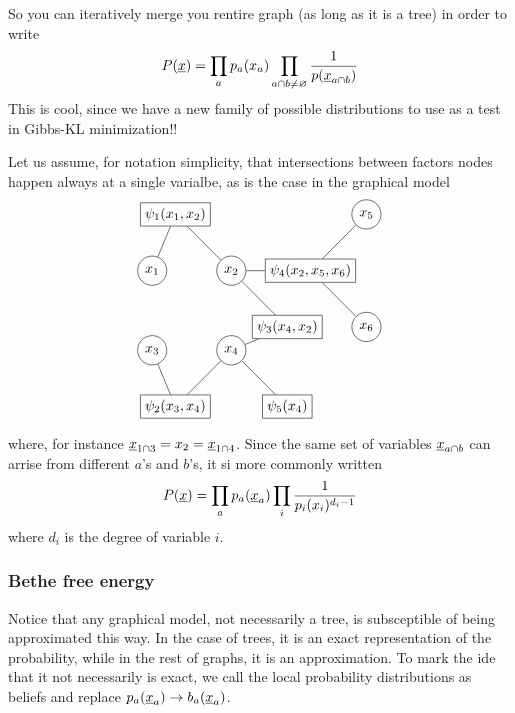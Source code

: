 So you can iteratively merge you rentire graph (as long as it is a tree) in order to write
\begin{equation}
 P(\underline{x}) = \prod_{a} p_a(x_a) \prod_{a \cap b\neq \varnothing} \frac 1 {p(\underline{x}_{a\cap b})}
\end{equation}
This is cool, since we have a new family of possible distributions to use as a test in Gibbs-KL minimization!!

Let us assume, for notation simplicity, that intersections between factors nodes happen always at a single varialbe, as is the case in the graphical model
\[
\begin{tikzpicture}[node distance=2cm]
  \node[draw, circle] (x1) {$x_1$};
  \node[draw, circle, right of=x1] (x2) {$x_2$};
  \node[draw, rectangle, right of=x2] (f4) {$\psi_4(x_2, x_5,x_6)$};
  \node[draw, circle, above right of=f4] (x5) {$x_5$};
  \node[draw, circle, below right of=f4] (x6) {$x_6$};
  \node[draw, circle, below of=x1] (x3) {$x_3$};
  \node[draw, circle, below of=x2] (x4) {$x_4$};
  \node[draw, rectangle, above left of=x2] (f1) {$\psi_1(x_1, x_2)$};
  \node[draw, rectangle, below left of=x4] (f2) {$\psi_2(x_3, x_4)$};
  \node[draw, rectangle, below right of=x4] (f5) {$\psi_5( x_4)$};
  \node[draw, rectangle, below right of=x2] (f3) {$\psi_3(x_4, x_2)$};
  \draw[-] (x1) -- (f1);
  \draw[-] (x2) -- (f1);
  \draw[-] (x3) -- (f2);
  \draw[-] (x4) -- (f2);
  \draw[-] (x4) -- (f3);
  \draw[-] (x2) -- (f3);
  \draw[-] (x2) -- (f4);
  \draw[-] (x4) -- (f5);
  \draw[-] (x5) -- (f4);
  \draw[-] (x6) -- (f4);
\end{tikzpicture}\]
where, for instance $\underline{x}_{1\cap 3} = x_2 = \underline{x}_{1\cap 4}$. Since the same set of variables $\underline{x}_{a\cap b}$ can arrise from different $a$'s and $b$'s, it si more commonly written
\begin{equation}
 P(\underline{x}) = \prod_{a} p_a(\underline{x}_a) \prod_{i} \frac 1 {p_i(x_i)^{d_i-1}} \label{eq:BPprob}
\end{equation}
where $d_i$ is the degree of variable $i$.

\subsubsection{Bethe free energy}

Notice that any graphical model, not necessarily a tree, is subsceptible of being approximated this way. In the case of trees, it is an exact representation of the probability, while in the rest of graphs, it is an approximation. To mark the ide that it not necessarily is exact, we call the local probability distributions as beliefs and replace $p_a(\underline{x}_a) \to b_a(\underline{x}_a)$.

